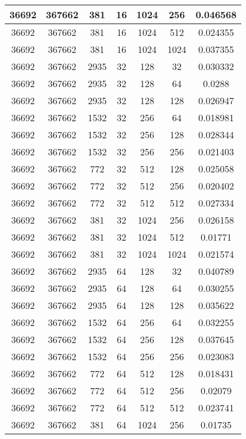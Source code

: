 \documentclass[9pt]{article}
\begin{document}
\begin{tabular}{|c|c|c|c|c|c|c| }
\hline
36692  & 367662  & 381  & 16  & 1024  & 256  & 0.046568 \\
\hline
36692  & 367662  & 381  & 16  & 1024  & 512  & 0.024355 \\
\hline
36692  & 367662  & 381  & 16  & 1024  & 1024  & 0.037355 \\
\hline
36692  & 367662  & 2935  & 32  & 128  & 32  & 0.030332 \\
\hline
36692  & 367662  & 2935  & 32  & 128  & 64  & 0.0288 \\
\hline
36692  & 367662  & 2935  & 32  & 128  & 128  & 0.026947 \\
\hline
36692  & 367662  & 1532  & 32  & 256  & 64  & 0.018981 \\
\hline
36692  & 367662  & 1532  & 32  & 256  & 128  & 0.028344 \\
\hline
36692  & 367662  & 1532  & 32  & 256  & 256  & 0.021403 \\
\hline
36692  & 367662  & 772  & 32  & 512  & 128  & 0.025058 \\
\hline
36692  & 367662  & 772  & 32  & 512  & 256  & 0.020402 \\
\hline
36692  & 367662  & 772  & 32  & 512  & 512  & 0.027334 \\
\hline
36692  & 367662  & 381  & 32  & 1024  & 256  & 0.026158 \\
\hline
36692  & 367662  & 381  & 32  & 1024  & 512  & 0.01771 \\
\hline
36692  & 367662  & 381  & 32  & 1024  & 1024  & 0.021574 \\
\hline
36692  & 367662  & 2935  & 64  & 128  & 32  & 0.040789 \\
\hline
36692  & 367662  & 2935  & 64  & 128  & 64  & 0.030255 \\
\hline
36692  & 367662  & 2935  & 64  & 128  & 128  & 0.035622 \\
\hline
36692  & 367662  & 1532  & 64  & 256  & 64  & 0.032255 \\
\hline
36692  & 367662  & 1532  & 64  & 256  & 128  & 0.037645 \\
\hline
36692  & 367662  & 1532  & 64  & 256  & 256  & 0.023083 \\
\hline
36692  & 367662  & 772  & 64  & 512  & 128  & 0.018431 \\
\hline
36692  & 367662  & 772  & 64  & 512  & 256  & 0.02079 \\
\hline
36692  & 367662  & 772  & 64  & 512  & 512  & 0.023741 \\
\hline
36692  & 367662  & 381  & 64  & 1024  & 256  & 0.01735 \\

\end{tabular}
\end{document}
